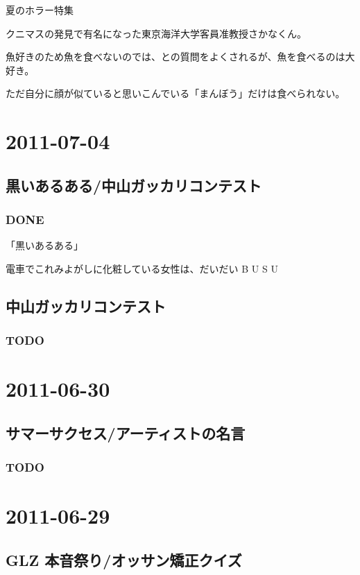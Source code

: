 \documentclass[11pt]{article}
\begin{document}
夏のホラー特集

クニマスの発見で有名になった東京海洋大学客員准教授さかなくん。

魚好きのため魚を食べないのでは、との質問をよくされるが、魚を食べるのは大好き。

ただ自分に顔が似ていると思いこんでいる「まんぼう」だけは食べられない。
\section{2011-07-04}
\label{sec-99}
\subsection{黒いあるある/中山ガッカリコンテスト}
\label{sec-99_1}
\subsubsection{\textbf{DONE}}
\label{sec-99_1_1}

「黒いあるある」

電車でこれみよがしに化粧している女性は、だいだい B U S U
\subsection{中山ガッカリコンテスト}
\label{sec-99_2}
\subsubsection{\textbf{TODO}}
\label{sec-99_2_1}
\section{2011-06-30}
\label{sec-100}
\subsection{サマーサクセス/アーティストの名言}
\label{sec-100_1}
\subsubsection{\textbf{TODO}}
\label{sec-100_1_1}
\section{2011-06-29}
\label{sec-101}
\subsection{GLZ 本音祭り/オッサン矯正クイズ}
\label{sec-101_1}
\end{document}
